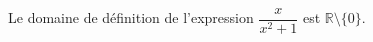 Le domaine de définition de l'expression $\dfrac{x}{x^2+1}$ est $\mathbb R \setminus \{0\}$.

\begin{reponses}
\end{reponses}

